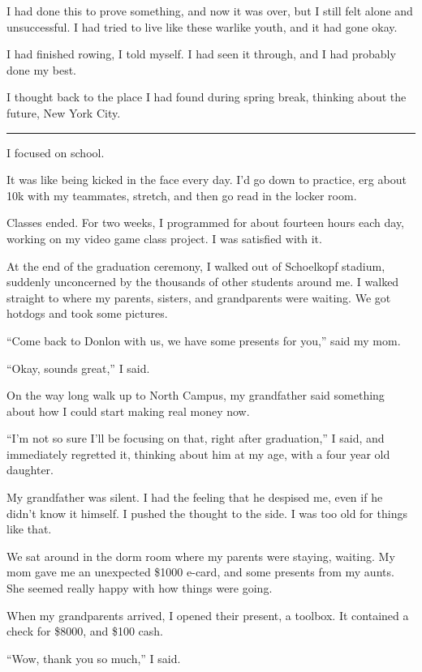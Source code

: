 I had done this to prove something, and now it was over, but I still felt alone
and unsuccessful.  I had tried to live like these warlike youth, and it had gone
okay.

I had finished rowing, I told myself.  I had seen it through, and I had probably
done my best.

I thought back to the place I had found during spring break, thinking about the
future, New York City.

\plainfancybreak{12pt}{2}{}

I focused on school.

It was like being kicked in the face every day.  I'd go down to practice, erg
about 10k with my teammates, stretch, and then go read in the locker room.

Classes ended.  For two weeks, I programmed for about fourteen hours each day,
working on my video game class project.  I was satisfied with it.

At the end of the graduation ceremony, I walked out of Schoelkopf stadium,
suddenly unconcerned by the thousands of other students around me.  I walked
straight to where my parents, sisters, and grandparents were waiting.  We got
hotdogs and took some pictures.

``Come back to Donlon with us, we have some presents for you,'' said my mom.

``Okay, sounds great,'' I said.

On the way long walk up to North Campus, my grandfather said something about how
I could start making real money now.

``I'm not so sure I'll be focusing on that, right after graduation,'' I said,
and immediately regretted it, thinking about him at my age, with a four year old
daughter.

My grandfather was silent.  I had the feeling that he despised me, even if he
didn't know it himself.  I pushed the thought to the side.  I was too old for
things like that.

We sat around in the dorm room where my parents were staying, waiting.  My mom
gave me an unexpected \$1000 e-card, and some presents from my aunts.  She
seemed really happy with how things were going.

When my grandparents arrived, I opened their present, a toolbox.  It contained a
check for \$8000, and \$100 cash.

``Wow, thank you so much,'' I said.
